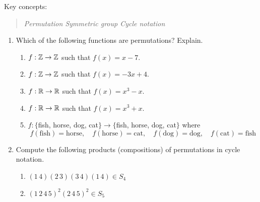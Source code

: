 \begin{exercises}
	Key concepts:
	\begin{quote}
		\emph{Permutation \qquad Symmetric group \qquad Cycle notation}
	\end{quote}
	
	\begin{enumerate}
	  \item Which of the following functions are permutations? Explain.
	  \begin{enumerate}
	      \item $f:\mathbb{Z}\to\mathbb{Z}$ such that $f(x)=x-7$.
	      \item $f:\mathbb{Z}\to\mathbb{Z}$ such that $f(x)=-3x+4$.
	      \item $f:\mathbb{R}\to\mathbb{R}$ such that $f(x)=x^3-x$.
	      \item $f:\mathbb{R}\to\mathbb{R}$ such that $f(x)=x^3+x$.
	      \item $f:\{$fish, horse, dog, cat$\}\to\{$fish, horse, dog, cat$\}$ where 
	      \[
	      	f(\text{fish})=\text{horse},\quad f(\text{horse})=\text{cat},\quad f(\text{dog})=\text{dog},\quad f(\text{cat})=\text{fish}
	      \]
	  \end{enumerate}
	    
	  
	  \item Compute the following products (compositions) of permutations in cycle notation.
	  \begin{enumerate}
	    \item {}\lstsp $(1\,4)(2\,3)(3\,4)(1\,4)\in S_4$
	    \setcounter{enumii}{2}
	    \item {}\lstsp $(1\,2\,4\,5)^2(2\,4\,5)^2\in S_5$
	  \end{enumerate}
	  
	  \goodbreak
	  

\end{enumerate}
\end{exercises}
